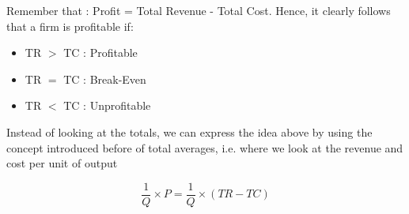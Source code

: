 \documentclass[english,course]{Notes}
\begin{document}
\par{Remember that  : Profit = Total Revenue - Total Cost. Hence, it clearly follows that a firm is profitable if:}

\begin{itemize}
	\item TR $>$ TC : Profitable
	\item TR $=$ TC : Break-Even
	\item TR $<$ TC : Unprofitable
\end{itemize}

\par{Instead of looking at the totals, we can express the idea above by using the concept introduced before of total averages, i.e. where we look at the revenue and cost per unit of output}

$$\frac{1}{Q} \times P = \frac{1}{Q} \times (TR - TC)$$
\end{document}
